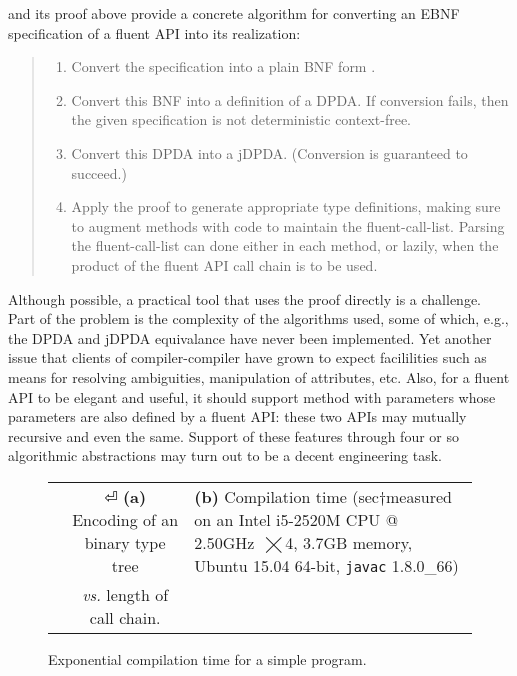  and its proof above provide
  a concrete algorithm for converting an EBNF specification of a fluent API into
its realization:
\begin{quote}
  \begin{enumerate}
    \item Convert the specification into a plain BNF form
    .
    \item Convert this BNF into a definition of a DPDA. If conversion fails,
      then the given specification is not deterministic context-free.
    \item Convert this DPDA into a jDPDA. (Conversion is guaranteed to succeed.)
    \item Apply the proof to generate appropriate \Java type definitions, making sure to
        augment methods with code to maintain the fluent-call-list.
        Parsing the fluent-call-list can done either in each method,
        or lazily, when the product of the fluent API call chain is to
         be used.
  \end{enumerate}
\end{quote}
Although possible, a practical tool that uses the proof directly 
  is a challenge. 
Part of the problem is the complexity of the 
  algorithms used, some of which, e.g., the DPDA and jDPDA equivalance have never been 
  implemented.
Yet another issue that clients of compiler-compiler have grown to expect 
  facililities such as means for resolving ambiguities, manipulation 
  of attributes, etc.
Also, for a fluent API to be elegant and useful, 
  it should support method with parameters whose parameters are also defined by a  fluent API:
these two APIs may mutually recursive and even the same. 
Support of these features through four or so algorithmic abstractions 
  may turn out to be a decent engineering task.

\begin{figure}[H]
  \caption{ \label{Figure:compiler} Exponential compilation time for a simple \Java program.
  }
  \begin{tabular}{@{}c@{}c@{}}
    \hspace{3ex}\parbox[c]{44ex}{} &
    \hspace{0ex} \parbox[c]{44ex}{}⏎
      \textbf{(a)} Encoding of an binary type tree 
    & 
      \textbf{(b)} Compilation time 
      (sec†{measured on an Intel i5-2520M CPU @ 2.50GHz~$⨉$4, 3.7GB memory, Ubuntu 15.04 64-bit, \texttt{javac} 1.8.0\_66})%
    \\ &
     \emph{vs.}
      length of call chain.
  \end{tabular}
\end{figure}


